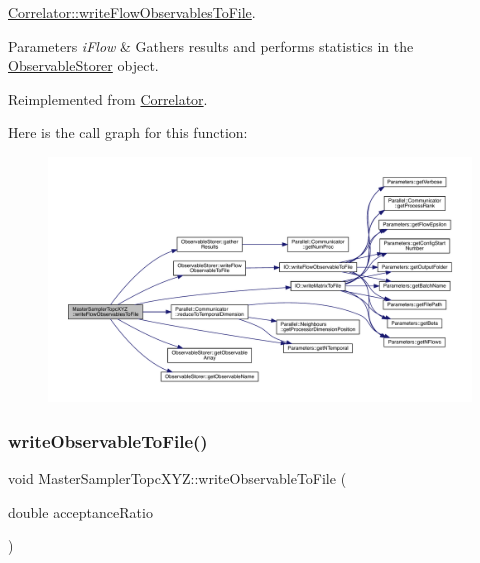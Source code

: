 \mbox{\hyperlink{class_correlator_a168512b2ce182d9478db47f100125fa6}{Correlator\+::write\+Flow\+Observables\+To\+File}}. 


\begin{DoxyParams}{Parameters}
{\em i\+Flow} & Gathers results and performs statistics in the \mbox{\hyperlink{class_observable_storer}{Observable\+Storer}} object. \\
\hline
\end{DoxyParams}


Reimplemented from \mbox{\hyperlink{class_correlator_a168512b2ce182d9478db47f100125fa6}{Correlator}}.

Here is the call graph for this function\+:
\nopagebreak
\begin{figure}[H]
\begin{center}
\leavevmode
\includegraphics[width=350pt]{class_master_sampler_topc_x_y_z_a4fba4290e4406e18ef3f2904c6ae364f_cgraph}
\end{center}
\end{figure}
\mbox{\label{class_master_sampler_topc_x_y_z_a930f13a2a13f4b3820f40c8b52110cf2}} 
\subsubsection{\texorpdfstring{writeObservableToFile()}{writeObservableToFile()}}
{\footnotesize\ttfamily void Master\+Sampler\+Topc\+X\+Y\+Z\+::write\+Observable\+To\+File (\begin{DoxyParamCaption}\item[{double}]{acceptance\+Ratio }\end{DoxyParamCaption})\hspace{0.3cm}{\ttfamily [virtual]}}



